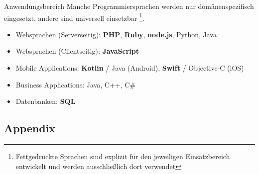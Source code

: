             \begin{frame}{Anwendungsbereich}
                Manche Programmiersprachen werden nur domänenspezifisch eingesetzt, andere sind universell einsetzbar \footnote{Fettgedruckte Sprachen sind explizit für den jeweiligen Einsatzbereich entwickelt und werden ausschließlich dort verwendet}.
                
                \begin{itemize}
                    \item Websprachen (Serverseitig): \textbf{PHP}, \textbf{Ruby}, \textbf{node.js}, Python, Java
                    \item Websprachen (Clientseitig): \textbf{JavaScript}
                    \item Mobile Applications: \textbf{Kotlin} / Java (Android), \textbf{Swift} / Objective-C (iOS)
                    \item Business Applications: Java, C++, C\#
                    \item Datenbanken: \textbf{SQL}
                \end{itemize}
            \end{frame}
            
            
            \subsection{Appendix}
            
